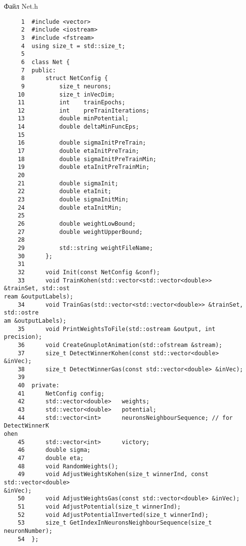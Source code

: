 Файл Net.h
\begin{verbatim}
     1	#include <vector>
     2	#include <iostream>
     3	#include <fstream>
     4	using size_t = std::size_t;
     5	
     6	class Net {
     7	public:
     8	    struct NetConfig {
     9	        size_t neurons;
    10	        size_t inVecDim;
    11	        int    trainEpochs;
    12	        int    preTrainIterations;
    13	        double minPotential;
    14	        double deltaMinFuncEps;
    15	        
    16	        double sigmaInitPreTrain;
    17	        double etaInitPreTrain;
    18	        double sigmaInitPreTrainMin;
    19	        double etaInitPreTrainMin;
    20	        
    21	        double sigmaInit;
    22	        double etaInit;
    23	        double sigmaInitMin;
    24	        double etaInitMin;
    25	
    26	        double weightLowBound;
    27	        double weightUpperBound;
    28	
    29	        std::string weightFileName;
    30	    };
    31	
    32	    void Init(const NetConfig &conf);
    33	    void TrainKohen(std::vector<std::vector<double>> &trainSet, std::ost
ream &outputLabels);
    34	    void TrainGas(std::vector<std::vector<double>> &trainSet, std::ostre
am &outputLabels);
    35	    void PrintWeightsToFile(std::ostream &output, int precision);
    36	    void CreateGnuplotAnimation(std::ofstream &stream);
    37	    size_t DetectWinnerKohen(const std::vector<double> &inVec);
    38	    size_t DetectWinnerGas(const std::vector<double> &inVec);
    39	
    40	private:
    41	    NetConfig config;
    42	    std::vector<double>   weights;
    43	    std::vector<double>   potential;
    44	    std::vector<int>      neuronsNeighbourSequence; // for DetectWinnerK
ohen
    45	    std::vector<int>      victory;
    46	    double sigma;
    47	    double eta;
    48	    void RandomWeights();
    49	    void AdjustWeightsKohen(size_t winnerInd, const std::vector<double> 
&inVec);
    50	    void AdjustWeightsGas(const std::vector<double> &inVec);
    51	    void AdjustPotential(size_t winnerInd);
    52	    void AdjustPotentialInverted(size_t winnerInd);
    53	    size_t GetIndexInNeuronsNeighbourSequence(size_t neuronNumber);
    54	};

\end{verbatim}
